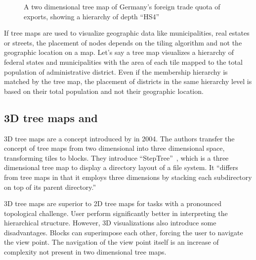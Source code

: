 \begin{figure}[ht]
    \centering
    \caption{A two dimensional tree map of Germany's foreign trade quota of exports, showing a hierarchy of depth ``HS4''}
    \label{fig:related-work:treemap-german-exports-2}
\end{figure}
If tree maps are used to visualize geographic data like municipalities, real estates or streets, the placement of nodes depends on the tiling algorithm and not the geographic location on a map.
Let's say a tree map visualizes a hierarchy of federal states and municipalities with the area of each tile mapped to the total population of administrative district.
Even if the membership hierarchy is matched by the tree map, the placement of districts in the same hierarchy level is based on their total population and not their geographic location.

\subsection{3D tree maps and \tmaps{}}
3D tree maps are a concept introduced by \textcite{Bladh2004} in 2004.
The authors transfer the concept of tree maps from two dimensional into three dimensional space, transforming tiles to blocks.
They introduce ``StepTree''~\cite{Bladh2004}, which is a three dimensional tree map to display a directory layout of a file system.
It ``differs from tree maps in that it employs three dimensions by stacking each subdirectory on top of its parent directory.''

3D tree maps are superior to 2D tree maps for tasks with a pronounced topological challenge.
User perform significantly better in interpreting the hierarchical structure.
However, 3D visualizations also introduce some disadvantages.
Blocks can superimpose each other, forcing the user to navigate the view point.
The navigation of the view point itself is an increase of complexity not present in two dimensional tree maps.


